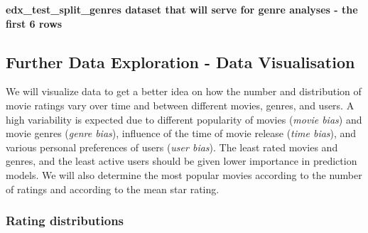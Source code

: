 \documentclass[
]{article}
\begin{document}
\textbf{edx\_test\_split\_genres dataset that will serve for genre
analyses - the first 6 rows}

\begin{table}[H]
\centering\begingroup\fontsize{10}{12}\selectfont

\endgroup{}
\end{table}

\hypertarget{further-data-exploration---data-visualisation}{%
\subsection{Further Data Exploration - Data
Visualisation}\label{further-data-exploration---data-visualisation}}

We will visualize data to get a better idea on how the number and
distribution of movie ratings vary over time and between different
movies, genres, and users. A high variability is expected due to
different popularity of movies (\emph{movie bias}) and movie genres
(\emph{genre bias}), influence of the time of movie release (\emph{time
bias}), and various personal preferences of users (\emph{user bias}).
The least rated movies and genres, and the least active users should be
given lower importance in prediction models. We will also determine the
most popular movies according to the number of ratings and according to
the mean star rating.

\newpage

\hypertarget{rating-distributions}{%
\subsubsection{Rating distributions}\label{rating-distributions}}
\end{document}
